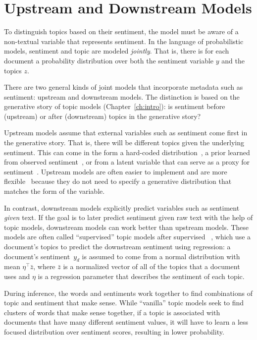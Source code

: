 
\section{Upstream and Downstream Models}

To distinguish topics based on their sentiment, the model must be
aware of a non-textual variable that represents sentiment.
In the language of probabilistic models,
sentiment and topic are modeled \emph{jointly}.  That is, there is for each document a
probability distribution over both the sentiment variable $y$ and
the topics $z$.

There are two general kinds of joint models that incorporate metadata
such as sentiment: upstream and downstream models.  The distinction is
based on the generative story of topic models (Chapter~\ref{ch:intro}): is
sentiment before (upstream) or after (downstream) topics in the
generative story?


Upstream models assume that external variables such as sentiment come first in the generative
story.  That is, there will be different topics given the underlying
sentiment.  This can come in the form a hard-coded distribution~\citep{mei-07b}, a prior learned from observed
sentiment~\citep{mimno-08}, or from a latent variable that can serve as
a proxy for sentiment~\citep{lin-09}.  Upstream models are often
easier to implement and are more flexible~\citep{stewart-14} because they do not need to specify a generative distribution that matches the form of the variable.

In contrast, downstream models explicitly predict variables such as sentiment
\emph{given} text.  If the goal is to later predict sentiment given
raw text with the help of topic models, downstream models can work
better than upstream models.  These models are often called
``supervised'' topic models after supervised
~\citep{blei-07b}, which use a document's topics to predict
the downstream sentiment using regression: a document's sentiment~$y_d$ is
assumed to come from a normal distribution with mean $\eta^\top \bar
z$, where $\bar z$ is a normalized vector of all of the topics that a
document uses and $\eta$ is a regression parameter that describes the
sentiment of each topic.

During inference, the words and sentiments work together to find
combinations of topic and sentiment that make sense.  While
``vanilla'' topic models seek to find clusters of words that make
sense together, if a topic is associated with documents that have many
different sentiment values, it will have to learn a less focused distribution over
sentiment scores, resulting in lower probability.  

